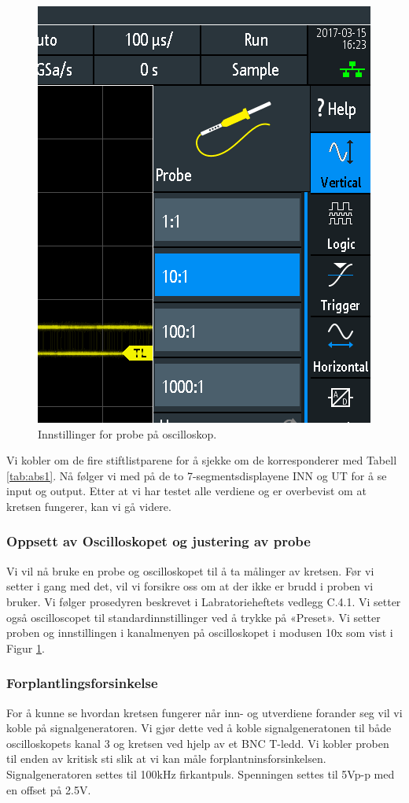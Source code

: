 \documentclass{article}
\begin{document}
\begin{figure}
	\includegraphics[scale=0.25]{SCR03}
	\caption{Innstillinger for probe på oscilloskop.}
	\label{fig:inst1}
\end{figure}

Vi kobler om de fire stiftlistparene for å sjekke om de korresponderer med Tabell \ref{tab:abs1}. Nå følger vi med på de to 7-segmentsdisplayene INN og UT for å se input og output. Etter at vi har testet alle verdiene og er overbevist om at kretsen fungerer, kan vi gå videre.

\subsubsection{Oppsett av Oscilloskopet og justering av probe}
Vi vil nå bruke en probe og oscilloskopet til å ta målinger av kretsen. Før vi setter i gang med det, vil vi forsikre oss om at der ikke er brudd i proben vi bruker. Vi følger prosedyren beskrevet i Labratorieheftets vedlegg C.4.1. Vi setter også oscilloscopet til standardinnstillinger ved å trykke på «Preset». Vi setter proben og innstillingen i kanalmenyen på oscilloskopet i modusen 10x som vist i Figur \ref{fig:inst1}.

\subsubsection{Forplantlingsforsinkelse}
For å kunne se hvordan kretsen fungerer når inn- og utverdiene forander seg vil vi koble på signalgeneratoren. Vi gjør dette ved å koble signalgeneratonen til både oscilloskopets kanal 3 og kretsen ved hjelp av et BNC T-ledd. Vi kobler proben til enden av kritisk sti slik at vi kan måle forplantninsforsinkelsen. Signalgeneratoren settes til 100kHz firkantpuls. Spenningen settes til 5Vp-p med en offset på 2.5V.
\end{document}
